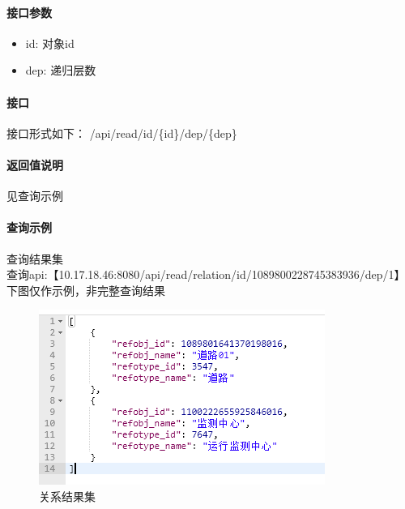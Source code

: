 \documentclass[UTF8, 12pt]{ctexart}
\begin{document}
	\paragraph{接口参数}
		\begin{itemize}
			\item id: 对象id
			\item dep: 递归层数
		\end{itemize}
	\paragraph{接口}
		接口形式如下：
		\newline
		{\color{red}/api/read/id/\{id\}/dep/\{dep\}}
	\paragraph{返回值说明}
		见查询示例

	\paragraph{查询示例}
		查询结果集 \\
		查询api:【10.17.18.46:8080/api/read/relation/id/1089800228745383936/dep/1】 \\
		下图仅作示例，非完整查询结果 \\
		\begin{figure}[H]
			\centering
			\includegraphics[width = 0.7\linewidth]{relation.png}
			\caption{关系结果集}
			\label{Fig:2}
			\vspace{-0.5cm}
		\end{figure}
\end{document}
